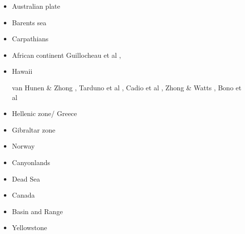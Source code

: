 \begin{itemize}
\item Australian plate 
{\scriptsize
\cite{himu03}\cite{wemv03}\cite{pymi03}\cite{onml03}
\cite{onmj05}
\cite{hazs10}\cite{dimg10}
\cite{mahg11}\cite{digm11}
\cite{gosk14}
\cite{scsp15}
}
\item Barents sea 
{\scriptsize
\cite{buto07b}
\cite{gahs13}
\cite{gahs14}
}
\item Carpathians 
{\scriptsize
\cite{clbm04}
\cite{isms05}
\cite{nehe06}
\cite{sepg19}
}
\item African continent 
{\scriptsize
\cite{gikb94}
\cite{vabt11}
\cite{busm12}
\cite{gagb14}
\cite{wakc17}
Guillocheau et al \cite{gusb18},
\cite{cels20}
}
\item Hawaii 
\begin{scriptsize}
van Hunen \& Zhong \cite{vazh03},
Tarduno et al \cite{tabs09},
Cadio et al \cite{cabp12},
Zhong \& Watts \cite{zhwa13},
Bono et al \cite{botb19}
\end{scriptsize}

\item Hellenic zone/ Greece  
{\scriptsize
\cite{spwv88}
\cite{guhf13}
\cite{olpr14}
}
\item Gibraltar zone 
{\scriptsize
\cite{gumr02}\cite{nebs02}
\cite{vanv08}
\cite{fufa10}
\cite{miab13}\cite{almb13}
\cite{medd15}\cite{furc15}
\cite{necf16}
\cite{casv19}
\cite{jitf19}
} 
\item Norway 
{\scriptsize
\cite{soma13}
\cite{bubj15}
}
\item Canyonlands 
{\scriptsize
\cite{trca94}
\cite{scwa02}
\cite{grsk03}
}
\item Dead Sea 
{\scriptsize
\cite{sopg05}
}
\item Canada 
{\scriptsize
\cite{brbw93}
\cite{pelj99}
}
\item Basin and Range 
{\scriptsize
\cite{brbe89c}
\cite{wefr09}
}
\item Yellowstone 
{\scriptsize
\cite{chus13}
}


\end{itemize}
